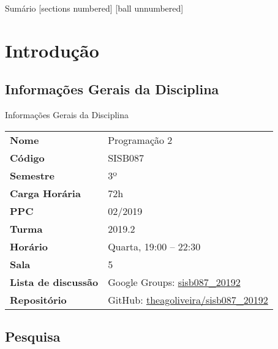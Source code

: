 \documentclass[10pt]{beamer}
\subtitle{Aula 1}
\date{23 de outubro de 2019}
\begin{document}
\maketitle

\begin{frame}{Sumário}
  [sections numbered]
  [ball unnumbered]
  \tableofcontents
\end{frame}

\section{Introdução}

\subsection{Informações Gerais da Disciplina}

\begin{frame}[fragile]{Informações Gerais da Disciplina}
    \begin{center}
        \begin{tabular}{@{}ll@{}}
            \toprule
            \textbf{Nome} & Programação 2 \\
            \textbf{Código} & SISB087 \\
            \textbf{Semestre} & 3º \\
            \textbf{Carga Horária} & 72h \\
            \textbf{PPC} & 02/2019 \\
            \textbf{Turma} & 2019.2 \\
            \textbf{Horário} & Quarta, 19:00 -- 22:30 \\
            \textbf{Sala} & 5 \\
            \textbf{Lista de discussão} & Google Groups: \href{https://groups.google.com/forum/#!forum/sisb087_20192}{\alert{sisb087\_20192}} \\
            \textbf{Repositório} & GitHub: \href{https://github.com/theagoliveira/sisb087_20192}{\alert{theagoliveira/sisb087\_20192}} \\
            \bottomrule
        \end{tabular}
    \end{center}
\end{frame}

\subsection{Pesquisa}
\end{document}

